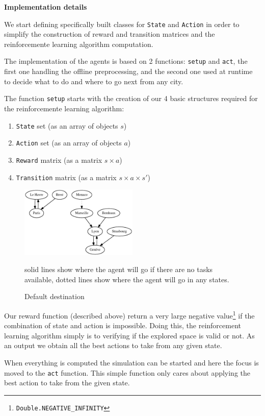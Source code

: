 \documentclass[11pt,a4paper]{article}
\begin{document}
\bigskip
\textbf{Implementation details}

We start defining specifically built classes for \texttt{State} and
\texttt{Action} in order to simplify the construction of reward and transition
matrices and the reinforcemente learning algorithm computation.

The implementation of the agents is based on 2 functions: \texttt{setup} and
\texttt{act}, the first one handling the offline preprocessing, and the second
one used at runtime to decide what to do and where to go next from any city.

The function \texttt{setup} starts with the creation of our 4 basic structures
required for the reinforcemente learning algorithm:

\begin{enumerate}
    \item{\texttt{State} set (as an array of objects $s$)}
    \item{\texttt{Action} set (as an array of objects $a$)}
    \item{\texttt{Reward} matrix (as a matrix $s \times a$)}
    \item{\texttt{Transition} matrix (as a matrix $s \times a \times s'$)}
\end{enumerate}

\begin{figure}
    \includegraphics[width=0.5\textwidth]{graph.eps}
    \caption{Default destination}{solid lines show where the agent will go if
    there are no tasks available, dotted lines show where the agent will go in
    any states.}
    \label{fig:graph}
\end{figure}

Our reward function (described above) return a very large
negative value\footnote{\texttt{Double.NEGATIVE\_INFINITY}} if the combination of
state and action is impossible. Doing this, the reinforcement learning algorithm
simply is to verifying if the explored space is valid or not. As an output
we obtain all the best actions to take from any given state.

When everything is computed the simulation can be started and here the focus is
moved to the \texttt{act} function. This simple function only cares about
applying the best action to take from the given state.
\end{document}
